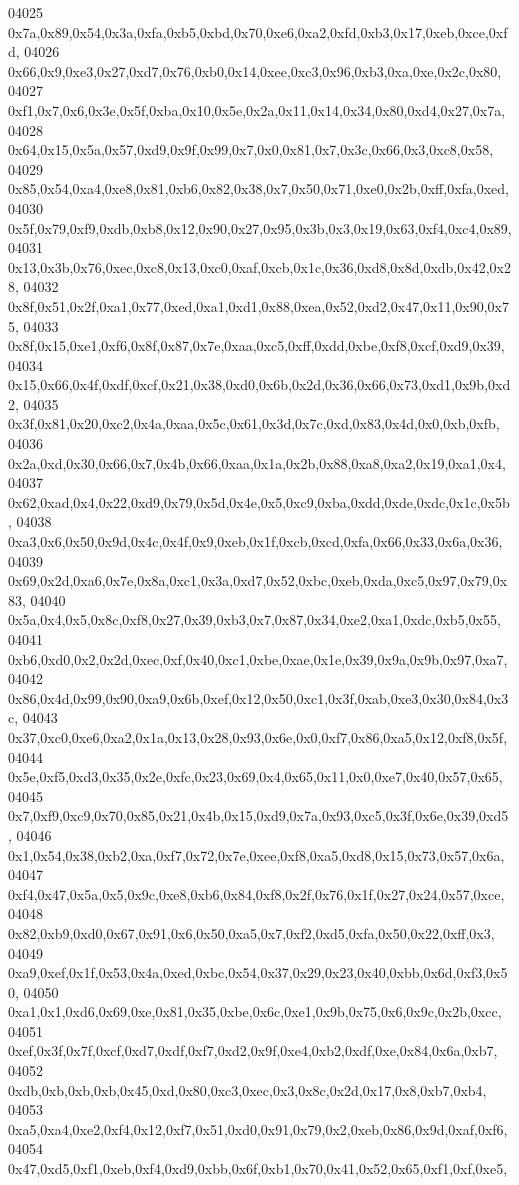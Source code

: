 \begin{DoxyCode}
04025   0x7a,0x89,0x54,0x3a,0xfa,0xb5,0xbd,0x70,0xe6,0xa2,0xfd,0xb3,0x17,0xeb,0xce,0xfd,
04026   0x66,0x9,0xe3,0x27,0xd7,0x76,0xb0,0x14,0xee,0xc3,0x96,0xb3,0xa,0xe,0x2c,0x80,
04027   0xf1,0x7,0x6,0x3e,0x5f,0xba,0x10,0x5e,0x2a,0x11,0x14,0x34,0x80,0xd4,0x27,0x7a,
04028   0x64,0x15,0x5a,0x57,0xd9,0x9f,0x99,0x7,0x0,0x81,0x7,0x3c,0x66,0x3,0xc8,0x58,
04029   0x85,0x54,0xa4,0xe8,0x81,0xb6,0x82,0x38,0x7,0x50,0x71,0xe0,0x2b,0xff,0xfa,0xed,
04030   0x5f,0x79,0xf9,0xdb,0xb8,0x12,0x90,0x27,0x95,0x3b,0x3,0x19,0x63,0xf4,0xc4,0x89,
04031   0x13,0x3b,0x76,0xec,0xc8,0x13,0xc0,0xaf,0xcb,0x1c,0x36,0xd8,0x8d,0xdb,0x42,0x28,
04032   0x8f,0x51,0x2f,0xa1,0x77,0xed,0xa1,0xd1,0x88,0xea,0x52,0xd2,0x47,0x11,0x90,0x75,
04033   0x8f,0x15,0xe1,0xf6,0x8f,0x87,0x7e,0xaa,0xc5,0xff,0xdd,0xbe,0xf8,0xcf,0xd9,0x39,
04034   0x15,0x66,0x4f,0xdf,0xcf,0x21,0x38,0xd0,0x6b,0x2d,0x36,0x66,0x73,0xd1,0x9b,0xd2,
04035   0x3f,0x81,0x20,0xc2,0x4a,0xaa,0x5c,0x61,0x3d,0x7c,0xd,0x83,0x4d,0x0,0xb,0xfb,
04036   0x2a,0xd,0x30,0x66,0x7,0x4b,0x66,0xaa,0x1a,0x2b,0x88,0xa8,0xa2,0x19,0xa1,0x4,
04037   0x62,0xad,0x4,0x22,0xd9,0x79,0x5d,0x4e,0x5,0xc9,0xba,0xdd,0xde,0xdc,0x1c,0x5b,
04038   0xa3,0x6,0x50,0x9d,0x4c,0x4f,0x9,0xeb,0x1f,0xcb,0xcd,0xfa,0x66,0x33,0x6a,0x36,
04039   0x69,0x2d,0xa6,0x7e,0x8a,0xc1,0x3a,0xd7,0x52,0xbc,0xeb,0xda,0xc5,0x97,0x79,0x83,
04040   0x5a,0x4,0x5,0x8c,0xf8,0x27,0x39,0xb3,0x7,0x87,0x34,0xe2,0xa1,0xdc,0xb5,0x55,
04041   0xb6,0xd0,0x2,0x2d,0xec,0xf,0x40,0xc1,0xbe,0xae,0x1e,0x39,0x9a,0x9b,0x97,0xa7,
04042   0x86,0x4d,0x99,0x90,0xa9,0x6b,0xef,0x12,0x50,0xc1,0x3f,0xab,0xe3,0x30,0x84,0x3c,
04043   0x37,0xc0,0xe6,0xa2,0x1a,0x13,0x28,0x93,0x6e,0x0,0xf7,0x86,0xa5,0x12,0xf8,0x5f,
04044   0x5e,0xf5,0xd3,0x35,0x2e,0xfc,0x23,0x69,0x4,0x65,0x11,0x0,0xe7,0x40,0x57,0x65,
04045   0x7,0xf9,0xc9,0x70,0x85,0x21,0x4b,0x15,0xd9,0x7a,0x93,0xc5,0x3f,0x6e,0x39,0xd5,
04046   0x1,0x54,0x38,0xb2,0xa,0xf7,0x72,0x7e,0xee,0xf8,0xa5,0xd8,0x15,0x73,0x57,0x6a,
04047   0xf4,0x47,0x5a,0x5,0x9c,0xe8,0xb6,0x84,0xf8,0x2f,0x76,0x1f,0x27,0x24,0x57,0xce,
04048   0x82,0xb9,0xd0,0x67,0x91,0x6,0x50,0xa5,0x7,0xf2,0xd5,0xfa,0x50,0x22,0xff,0x3,
04049   0xa9,0xef,0x1f,0x53,0x4a,0xed,0xbc,0x54,0x37,0x29,0x23,0x40,0xbb,0x6d,0xf3,0x50,
04050   0xa1,0x1,0xd6,0x69,0xe,0x81,0x35,0xbe,0x6c,0xe1,0x9b,0x75,0x6,0x9c,0x2b,0xcc,
04051   0xef,0x3f,0x7f,0xcf,0xd7,0xdf,0xf7,0xd2,0x9f,0xe4,0xb2,0xdf,0xe,0x84,0x6a,0xb7,
04052   0xdb,0xb,0xb,0xb,0x45,0xd,0x80,0xc3,0xec,0x3,0x8c,0x2d,0x17,0x8,0xb7,0xb4,
04053   0xa5,0xa4,0xe2,0xf4,0x12,0xf7,0x51,0xd0,0x91,0x79,0x2,0xeb,0x86,0x9d,0xaf,0xf6,
04054   0x47,0xd5,0xf1,0xeb,0xf4,0xd9,0xbb,0x6f,0xb1,0x70,0x41,0x52,0x65,0xf1,0xf,0xe5,

\end{DoxyCode}
